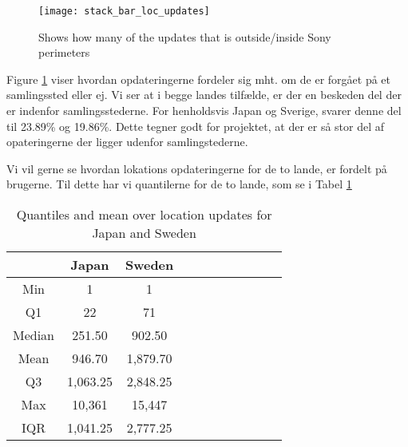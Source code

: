 \begin{figure}[H]
    \hspace*{-2.2cm}
    \centering
    \texttt{[image: stack\_bar\_loc\_updates]}
    \caption{Shows how many of the updates that is outside/inside Sony perimeters}
    \label{fig:hq_stack_bar}
\end{figure}

Figure \ref{fig:hq_stack_bar} viser hvordan opdateringerne fordeler sig mht. om de er forgået på et samlingssted eller ej. Vi ser at i begge landes tilfælde, er der en beskeden del der er indenfor samlingsstederne. For henholdsvis Japan og Sverige, svarer denne del til 23.89\% og 19.86\%. 
Dette tegner godt for projektet, at der er så stor del af opateringerne der ligger udenfor samlingstederne. 

Vi vil gerne se hvordan lokations opdateringerne for de to lande, er fordelt på brugerne. Til dette har vi quantilerne for de to lande, som se i Tabel \ref{tab:stat_loc_updates} 

\begin{table}[htbp]
        \centering
        \small
        \setlength\tabcolsep{2pt}
        \begin{tabular}{|c|c|c|c|c|c|c|c|c|c|c|}
            \hline
                         & Japan      &   Sweden      \\[-1pt]
            \hline
                 Min     &    1       &   1           \\
            \hline
                 Q1      &  22        &   71      \\
            \hline
                 Median  & 251.50     &   902.50      \\
            \hline
                 Mean    &  946.70   &  1,879.70     \\
            \hline
                 Q3      & 1,063.25    &   2,848.25     \\
            \hline
                 Max     &  10,361 &  15,447     \\
            \hline
                 IQR     &  1,041.25   &  2,777.25      \\
            \hline
            
        \end{tabular}
        \caption{Quantiles and mean over location updates for Japan and Sweden} %
        \label{tab:stat_loc_updates}
\end{table}



